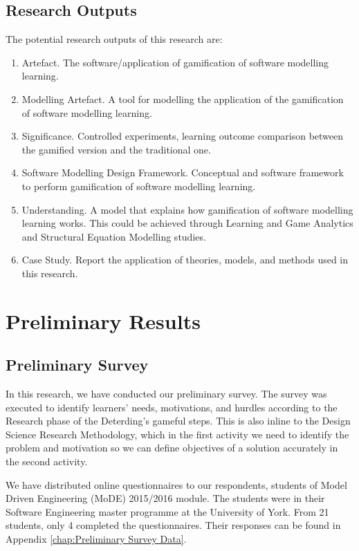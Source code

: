 \documentclass[12pt, a4paper]{report}
\begin{document}
\section{Research Outputs}
The potential research outputs of this research are:
\begin{enumerate}
\item Artefact. The software/application of gamification of software modelling learning.
\item Modelling Artefact. A tool for modelling the application of the gamification of software modelling learning.
\item Significance. Controlled experiments, learning outcome comparison between the gamified version and the traditional one.
\item Software Modelling Design Framework. Conceptual and software framework to perform gamification of software modelling learning.
\item Understanding. A model that explains how gamification of software modelling learning works.
This could be achieved through Learning and Game Analytics and Structural Equation Modelling studies.
\item Case Study. Report the application of theories, models, and methods used in this research.
\end{enumerate}

\chapter{Preliminary Results}

\section{Preliminary Survey}
\label{Preliminary Survey}
In this research, we have conducted our preliminary survey. The survey was executed to identify learners' needs, motivations, and hurdles according to the Research phase of the Deterding's gameful steps. This is also inline to the Design Science Research Methodology, which in the first activity we need to identify the problem and motivation so we can define objectives of a solution accurately in the second activity. 

We have distributed online questionnaires to our respondents, students of Model Driven Engineering (MoDE) 2015/2016 module. The students were in their Software Engineering master programme at the University of York. From 21 students, only 4 completed the questionnaires. Their responses can be found in Appendix \autoref{chap:Preliminary Survey Data}.
\end{document}
